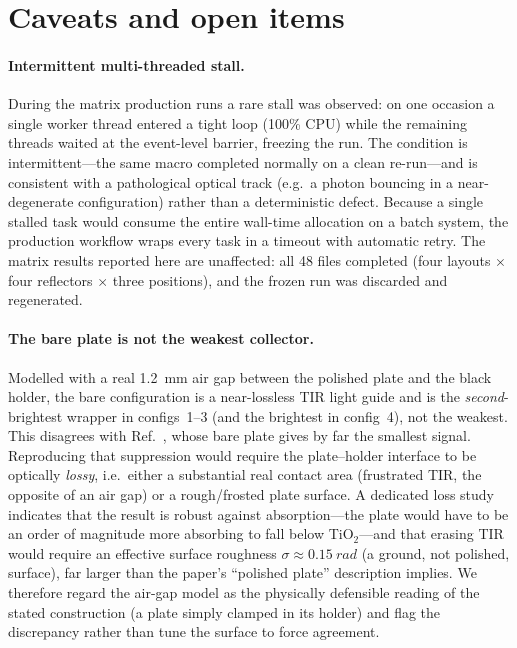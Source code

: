 \documentclass[11pt,a4paper]{article}
\begin{document}
\section{Caveats and open items}
\label{sec:caveats}

\paragraph{Intermittent multi-threaded stall.}
During the matrix production runs a rare stall was observed: on one occasion a
single worker thread entered a tight loop (100\% CPU) while the remaining
threads waited at the event-level barrier, freezing the run. The condition is
intermittent---the same macro completed normally on a clean re-run---and is
consistent with a pathological optical track (e.g.\ a photon bouncing in a
near-degenerate configuration) rather than a deterministic defect. Because a
single stalled task would consume the entire wall-time allocation on a batch
system, the production workflow wraps every task in a timeout with automatic
retry. The matrix results reported here are unaffected: all 48 files completed
(four layouts $\times$ four reflectors $\times$ three positions), and the frozen
run was discarded and regenerated.

\paragraph{The bare plate is not the weakest collector.}
Modelled with a real \SI{1.2}{\milli\meter} air gap between the polished plate
and the black holder, the bare configuration is a near-lossless TIR light guide
and is the \emph{second}-brightest wrapper in configs~1--3 (and the brightest in
config~4), not the weakest. This disagrees with Ref.~\cite{Rao2025}, whose bare
plate gives by far the smallest signal. Reproducing that suppression would
require the plate--holder interface to be optically \emph{lossy}, i.e.\ either a
substantial real contact area (frustrated TIR, the opposite of an air gap) or a
rough/frosted plate surface. A dedicated loss study indicates that the result is
robust against absorption---the plate would have to be an order of magnitude
more absorbing to fall below TiO$_2$---and that erasing TIR would require an
effective surface roughness $\sigma \approx \SI{0.15}{rad}$ (a ground, not
polished, surface), far larger than the paper's ``polished plate'' description
implies. We therefore regard the air-gap model as the physically defensible
reading of the stated construction (a plate simply clamped in its holder) and
flag the discrepancy rather than tune the surface to force agreement.
\end{document}
